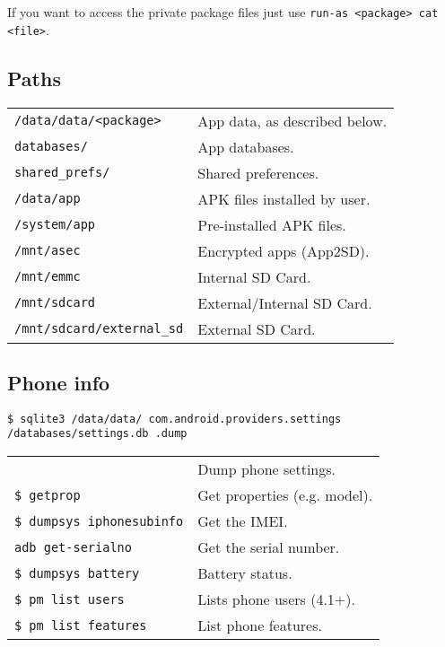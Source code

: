 \documentclass[11pt,landscape,a4paper]{article}
\begin{document}
\begin{multicols}{3}
\vspace*{2mm}

If you want to access the private package files just use \verb!run-as <package> cat <file>!.

\subsection{Paths}
\begin{tabular}{@{}ll@{}}
\texttt{/data/data/<package>} & App data, as described below.\\
\hspace*{4mm} \texttt{databases/} & App databases.\\
\hspace*{4mm} \texttt{shared\_prefs/} & Shared preferences.\\
\texttt{/data/app} & APK files installed by user.\\
\texttt{/system/app} & Pre-installed APK files.\\
\texttt{/mnt/asec} & Encrypted apps (App2SD).\\
\texttt{/mnt/emmc} & Internal SD Card.\\
\texttt{/mnt/sdcard} & External/Internal SD Card.\\
\texttt{/mnt/sdcard/external\_sd} & External SD Card.\\
\end{tabular}

\parbox{0.25\textwidth}{
\subsection{Phone info}
\texttt{\$ sqlite3 /data/data/ com.android.providers.settings /databases/settings.db  .dump}
\begin{tabular}{@{}ll@{}}
\texttt{} & Dump phone settings. \\
\texttt{\$ getprop} & Get properties (e.g. model). \\
\texttt{\$ dumpsys iphonesubinfo} & Get the IMEI.\\
\texttt{adb get-serialno} & Get the serial number.\\
\texttt{\$ dumpsys battery} & Battery status.\\
\texttt{\$ pm list users}  &  Lists phone users (4.1+). \\
\texttt{\$ pm list features}  &  List phone features.\\
\end{tabular}}


\end{multicols}
\end{document}
